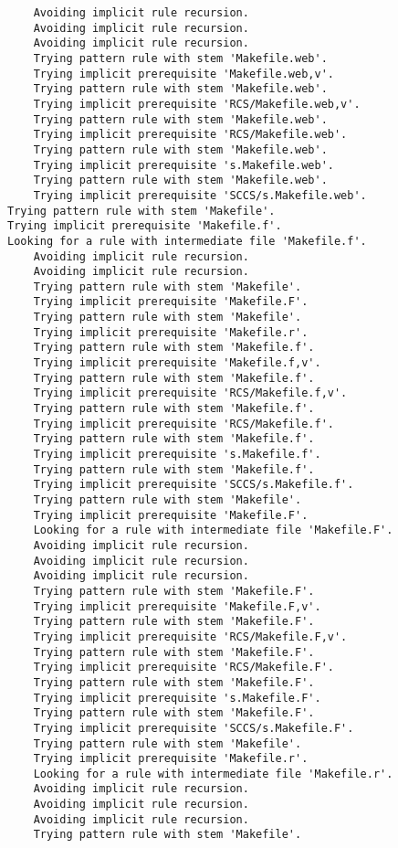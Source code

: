 \documentclass[11pt]{article}
\begin{document}
\begin{enumerate}
\begin{enumerate}
\begin{verbatim}
    Avoiding implicit rule recursion.
    Avoiding implicit rule recursion.
    Avoiding implicit rule recursion.
    Trying pattern rule with stem 'Makefile.web'.
    Trying implicit prerequisite 'Makefile.web,v'.
    Trying pattern rule with stem 'Makefile.web'.
    Trying implicit prerequisite 'RCS/Makefile.web,v'.
    Trying pattern rule with stem 'Makefile.web'.
    Trying implicit prerequisite 'RCS/Makefile.web'.
    Trying pattern rule with stem 'Makefile.web'.
    Trying implicit prerequisite 's.Makefile.web'.
    Trying pattern rule with stem 'Makefile.web'.
    Trying implicit prerequisite 'SCCS/s.Makefile.web'.
Trying pattern rule with stem 'Makefile'.
Trying implicit prerequisite 'Makefile.f'.
Looking for a rule with intermediate file 'Makefile.f'.
    Avoiding implicit rule recursion.
    Avoiding implicit rule recursion.
    Trying pattern rule with stem 'Makefile'.
    Trying implicit prerequisite 'Makefile.F'.
    Trying pattern rule with stem 'Makefile'.
    Trying implicit prerequisite 'Makefile.r'.
    Trying pattern rule with stem 'Makefile.f'.
    Trying implicit prerequisite 'Makefile.f,v'.
    Trying pattern rule with stem 'Makefile.f'.
    Trying implicit prerequisite 'RCS/Makefile.f,v'.
    Trying pattern rule with stem 'Makefile.f'.
    Trying implicit prerequisite 'RCS/Makefile.f'.
    Trying pattern rule with stem 'Makefile.f'.
    Trying implicit prerequisite 's.Makefile.f'.
    Trying pattern rule with stem 'Makefile.f'.
    Trying implicit prerequisite 'SCCS/s.Makefile.f'.
    Trying pattern rule with stem 'Makefile'.
    Trying implicit prerequisite 'Makefile.F'.
    Looking for a rule with intermediate file 'Makefile.F'.
    Avoiding implicit rule recursion.
    Avoiding implicit rule recursion.
    Avoiding implicit rule recursion.
    Trying pattern rule with stem 'Makefile.F'.
    Trying implicit prerequisite 'Makefile.F,v'.
    Trying pattern rule with stem 'Makefile.F'.
    Trying implicit prerequisite 'RCS/Makefile.F,v'.
    Trying pattern rule with stem 'Makefile.F'.
    Trying implicit prerequisite 'RCS/Makefile.F'.
    Trying pattern rule with stem 'Makefile.F'.
    Trying implicit prerequisite 's.Makefile.F'.
    Trying pattern rule with stem 'Makefile.F'.
    Trying implicit prerequisite 'SCCS/s.Makefile.F'.
    Trying pattern rule with stem 'Makefile'.
    Trying implicit prerequisite 'Makefile.r'.
    Looking for a rule with intermediate file 'Makefile.r'.
    Avoiding implicit rule recursion.
    Avoiding implicit rule recursion.
    Avoiding implicit rule recursion.
    Trying pattern rule with stem 'Makefile'.

\end{verbatim}
\end{enumerate}
\end{enumerate}
\end{document}
